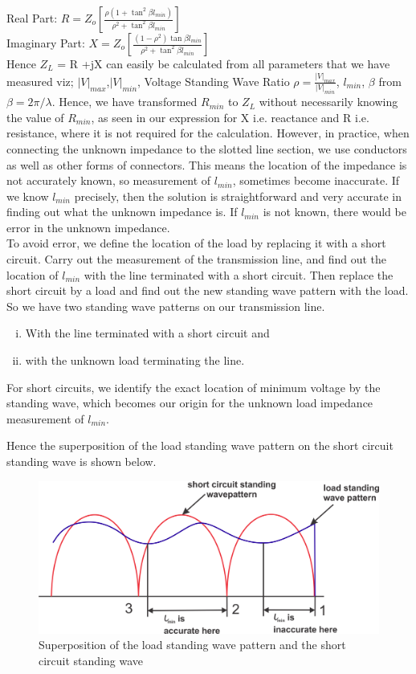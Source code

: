 Real Part: $R = Z_o[\frac{\rho (1 + \tan^{2}\beta l_{min})}{\rho^{2} + \tan^{2}\beta l_{min}}]$\\

Imaginary Part: $ X = Z_o[\frac{(1-\rho^{2})\tan\beta l_{min}}{\rho^{2} + \tan^{2}\beta l_{min}}]  $\\

Hence $Z_{L}$ = R +jX can easily be calculated from all parameters that we have measured viz; $|V|_{max}$,$|V|_{min}$, Voltage Standing Wave Ratio $\rho = \frac{|V|_{max}}{|V|_{min}}$, $l_{min}$, $\beta$ from $\beta = 2\pi/\lambda$. Hence, we have transformed $R_{min}$ to $Z_{L}$ without necessarily knowing the value of $R_{min}$, as seen in our expression for X i.e. reactance and R i.e. resistance, where it is not required for the calculation. 
However, in practice, when connecting the unknown impedance to the slotted line section, we use conductors as well as other forms of connectors. This means the location of the impedance is not accurately known, so measurement of $l_{min}$, sometimes become inaccurate. If we know $l_{min}$ precisely, then the solution is straightforward and very accurate in finding out what the unknown impedance is. If $l_{min}$ is not known, there would be error in the unknown impedance.\\

To avoid error, we define the location of the load by replacing it with a short circuit. Carry out the measurement of the transmission line, and find out the location of $l_{min}$ with the line terminated with a short circuit. Then replace the short circuit by a load and find out the new standing wave pattern with the load. So we have two standing wave patterns on our transmission line. 
\begin{enumerate}[(i)]
\item With the line terminated with a short circuit and 
\item with the unknown load terminating the line.
\end{enumerate}
For short circuits, we identify the exact location of minimum voltage by the standing wave, which becomes our origin for the unknown load impedance measurement of $l_{min}$.

Hence the superposition of the load standing wave pattern on the short circuit standing wave is shown below.
\begin{figure}[h]
\centering
\includegraphics[width=1\linewidth]{./graphics/group10diagram2}
\caption{Superposition of the load standing wave pattern and the short circuit standing wave}
\end{figure}

